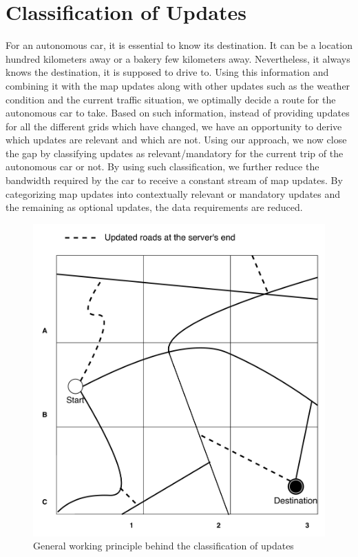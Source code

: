 \section{Classification of Updates} \label{classificationofupdates}
For an autonomous car, it is essential to know its destination. It can be a location hundred kilometers away or a bakery few kilometers away. Nevertheless, it always knows the destination, it is supposed to drive to. Using this information and combining it with the map updates along with other updates such as the weather condition and the current traffic situation, we optimally decide a route for the autonomous car to take. Based on such information, instead of providing updates for all the different grids which have changed, we have an opportunity to derive which updates are relevant and which are not. Using our approach, we now close the gap by classifying updates as relevant/mandatory for the current trip of the autonomous car or not. By using such classification, we further reduce the bandwidth required by the car to receive a constant stream of map updates. By categorizing map updates into contextually relevant or mandatory updates and the remaining as optional updates, the data requirements are reduced. \\

\begin{figure}
\centering
\includegraphics[scale=.1]{classification.png}
\caption{General working principle behind the classification of updates}
\label{fg:classificationofmapupdate}
\end{figure}

